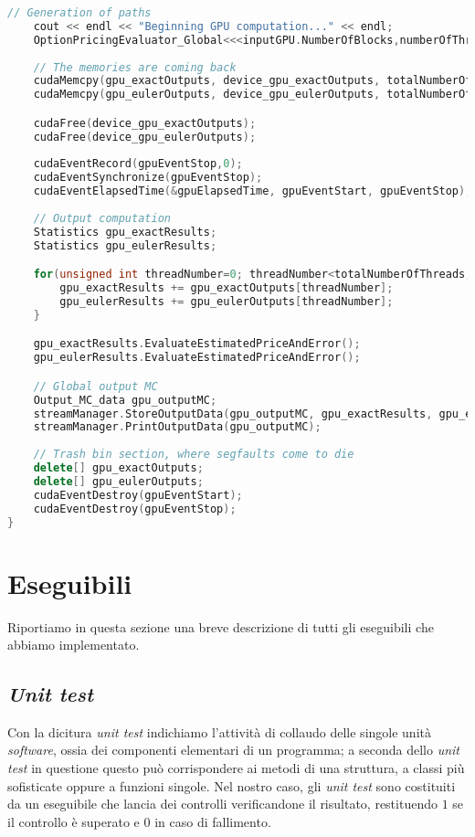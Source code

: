 \begin{lstlisting}[language=C++, caption={\texttt{libraries/CoreLibraries/SupportFunctions/Support\_functions.cu}}]
	// Generation of paths
	cout << endl << "Beginning GPU computation..." << endl;
	OptionPricingEvaluator_Global<<<inputGPU.NumberOfBlocks,numberOfThreadsPerBlock>>>(inputGPU, inputOption, inputMarket, inputMC, device_gpu_exactOutputs, device_gpu_eulerOutputs, seed);
	
	// The memories are coming back
	cudaMemcpy(gpu_exactOutputs, device_gpu_exactOutputs, totalNumberOfThreads*sizeof(Statistics), cudaMemcpyDeviceToHost);
	cudaMemcpy(gpu_eulerOutputs, device_gpu_eulerOutputs, totalNumberOfThreads*sizeof(Statistics), cudaMemcpyDeviceToHost);

	cudaFree(device_gpu_exactOutputs);
	cudaFree(device_gpu_eulerOutputs);
	
	cudaEventRecord(gpuEventStop,0);
	cudaEventSynchronize(gpuEventStop);
	cudaEventElapsedTime(&gpuElapsedTime, gpuEventStart, gpuEventStop);
	
	// Output computation
	Statistics gpu_exactResults;
	Statistics gpu_eulerResults;

	for(unsigned int threadNumber=0; threadNumber<totalNumberOfThreads; ++threadNumber){
		gpu_exactResults += gpu_exactOutputs[threadNumber];
		gpu_eulerResults += gpu_eulerOutputs[threadNumber];
	}

	gpu_exactResults.EvaluateEstimatedPriceAndError();
	gpu_eulerResults.EvaluateEstimatedPriceAndError();

	// Global output MC
	Output_MC_data gpu_outputMC;
	streamManager.StoreOutputData(gpu_outputMC, gpu_exactResults, gpu_eulerResults, gpuElapsedTime, 'd');
	streamManager.PrintOutputData(gpu_outputMC);
	
	// Trash bin section, where segfaults come to die
	delete[] gpu_exactOutputs;
	delete[] gpu_eulerOutputs;
	cudaEventDestroy(gpuEventStart);
	cudaEventDestroy(gpuEventStop);
}
\end{lstlisting}

\section{Eseguibili}
Riportiamo in questa sezione una breve descrizione di tutti gli eseguibili che abbiamo implementato.

\subsection{\textit{Unit test}}
Con la dicitura \textit{unit test} indichiamo l'attività di collaudo delle singole unità \textit{software}, ossia dei componenti elementari di un programma; a seconda dello \textit{unit test} in questione questo può corrispondere ai metodi di una struttura, a classi più sofisticate oppure a funzioni singole. Nel nostro caso, gli \textit{unit test} sono costituiti da un eseguibile che lancia dei controlli verificandone il risultato, restituendo $1$ se il controllo è superato e $0$ in caso di fallimento.

